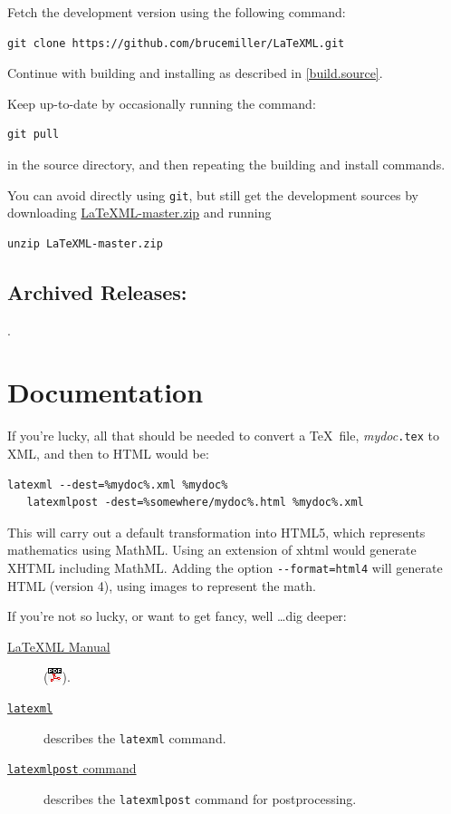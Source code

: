 \documentclass{article}
\newcommand{\PDFIcon}{\includegraphics{pdf}}
\begin{document}
Fetch the development version using the following command:
\begin{lstlisting}[style=shell]
git clone https://github.com/brucemiller/LaTeXML.git
\end{lstlisting}
Continue with building and installing as described in \ref{build.source}.

Keep up-to-date by occasionally running the command:
\begin{lstlisting}[style=shell]
git pull
\end{lstlisting}
in the source directory, and then repeating the building and install commands.

You can avoid directly using \texttt{git}, but still get the development sources
by downloading
\href{https://github.com/brucemiller/LaTeXML/archive/master.zip}{LaTeXML-master.zip}
and running
\begin{lstlisting}[style=shell]
unzip LaTeXML-master.zip
\end{lstlisting}

\subsection{Archived Releases:}\label{archive}
\AllReleases.

\section{Documentation}\label{docs}
If you're lucky, all that should be needed to convert
a \TeX\ file, \textit{mydoc}\texttt{.tex} to XML, and
then to HTML would be:
\begin{lstlisting}[style=shell]
   latexml --dest=%mydoc%.xml %mydoc%
   latexmlpost -dest=%somewhere/mydoc%.html %mydoc%.xml
\end{lstlisting}
This will carry out a default transformation into HTML5,
which represents mathematics using MathML.  Using an
extension of xhtml would generate XHTML including MathML.
Adding the option \verb|--format=html4| will generate
HTML (version 4), using images to represent the math.

If you're not so lucky, or want to get fancy, well \ldots dig deeper:
\begin{description}
\item[\href{manual/}{LaTeXML Manual}] (\href{manual.pdf}{\PDFIcon}).
\item[\href{manual/commands/latexml.html}{\texttt{latexml}}]
    describes the \texttt{latexml} command.
\item[\href{manual/commands/latexmlpost.html}{\texttt{latexmlpost} command}]
   describes the \texttt{latexmlpost} command for postprocessing.
\end{description}
\end{document}

